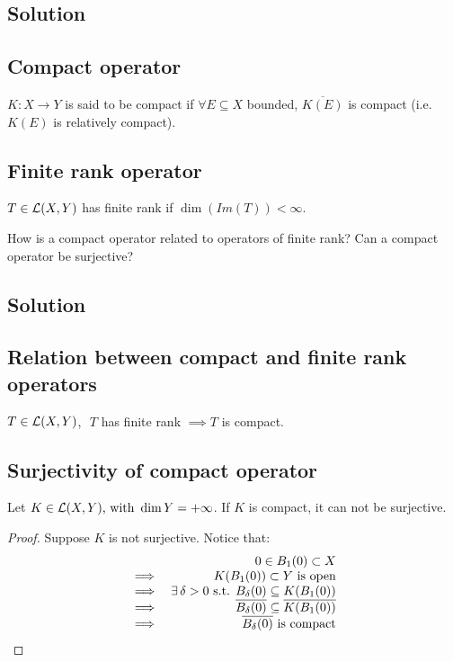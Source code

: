 \subsection*{Solution}

\subsection{Compact operator}
$K:X\to Y$ is said to be compact if $\forall E \subseteq X$ bounded, $\overline{K(E)}$ is compact (i.e. $K(E)$ is relatively compact).
\subsection{Finite rank operator}
$T \in \mathcal{L}(X,Y) $ has finite rank if $\dim(Im(T)) <\infty$.


\question
How is a compact operator related to operators of finite rank? Can a compact operator be surjective?

\subsection*{Solution}

\subsection{Relation between compact and finite rank operators}
$T \in \mathcal{L}(X,Y)$,\,\, $T$ has finite rank $\implies T$ is compact.

\subsection{Surjectivity of compact operator}
Let $K \in \mathcal{L}(X,Y)\mbox{, with }\dim Y=+\infty$. If $K$ is compact, it can not be surjective.

\begin{proof}
Suppose $K $ is not surjective. 
Notice that: \[\\ \begin{array}{lr}
    &  0 \in B_1(0) \subset X  \\
     \implies &K(B_1(0))\subset Y\mbox{ is open}  \\
  \implies   & \exists \,\delta>0 \mbox{ s.t. } B_{\delta}(0) \subseteq K(B_1(0))\\
  \implies&\overline{B_{\delta}(0)} \subseteq \overline{K(B_{1}(0))}\\
  \implies & \overline{B_{\delta}(0)}\mbox{ is compact}
\end{array}\]
\end{proof}

